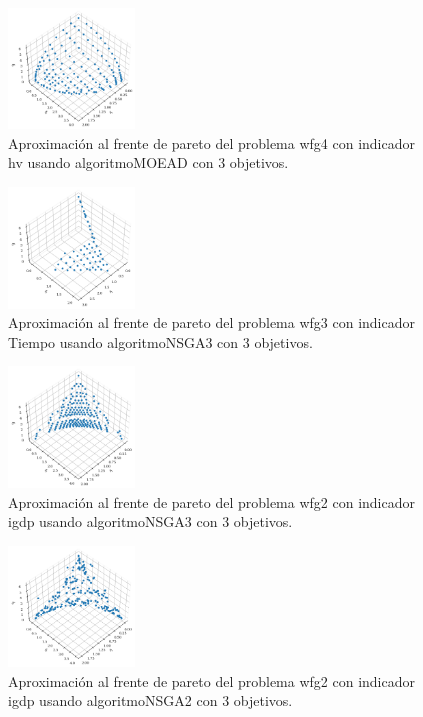 \documentclass{article}
\begin{document}
\clearpage
\begin{figure}
	\includegraphics[width=0.3\textwidth]{MOEAD_wfg4_hv_3_fp.png}
	\caption{Aproximación al frente de pareto del problema wfg4 con indicador hv usando algoritmoMOEAD con 3 objetivos.}
\end{figure}
\begin{figure}
	\includegraphics[width=0.3\textwidth]{NSGA3_wfg3_Tiempo_3_fp.png}
	\caption{Aproximación al frente de pareto del problema wfg3 con indicador Tiempo usando algoritmoNSGA3 con 3 objetivos.}
\end{figure}
\begin{figure}
	\includegraphics[width=0.3\textwidth]{NSGA3_wfg2_igdp_3_fp.png}
	\caption{Aproximación al frente de pareto del problema wfg2 con indicador igdp usando algoritmoNSGA3 con 3 objetivos.}
\end{figure}
\clearpage
\begin{figure}
	\includegraphics[width=0.3\textwidth]{NSGA2_wfg2_igdp_3_fp.png}
	\caption{Aproximación al frente de pareto del problema wfg2 con indicador igdp usando algoritmoNSGA2 con 3 objetivos.}
\end{figure}
\end{document}
